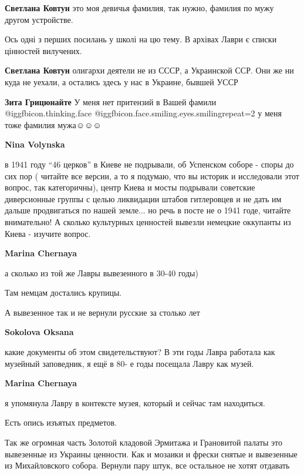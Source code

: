 \begin{itemize}
\begin{itemize}
\begin{itemize}
\textbf{Светлана Ковтун} это моя девичья фамилия, так нужно, фамилия по мужу другом устройстве.

Ось одні з перших посилань у школі на цю тему.
В архівах Лаври є списки цінностей вилучених.

\textbf{Светлана Ковтун} олигархи деятели не из СССР, а Украинской ССР. Они же ни куда не уехали, а остались здесь у нас в Украине, бывшей УССР

\textbf{Зита Грицюнайте}
У меня нет притензий в Вашей фамили  @igg{fbicon.thinking.face}  @igg{fbicon.face.smiling.eyes.smiling}{repeat=2} у меня тоже фамилия мужа☺☺☺

\end{itemize} %

\textbf{Nina Volynska} 

в 1941 году \enquote{46 церков} в Киеве не подрывали, об Успенском соборе - споры до сих
пор ( читайте все версии, а то я подумаю, что вы историк и исследовали этот
вопрос, так категоричны), центр Киева и мосты подрывали советские диверсионные
группы с целью ликвидации штабов гитлеровцев и не дать им дальше продвигаться
по нашей земле... но речь в посте не о 1941 годе, читайте внимательно! А сколько
культурных ценностей вывезли немецкие оккупанты из Киева - изучите вопрос.

\begin{itemize} %
\textbf{Marina Chernaya} 

а сколько из той же Лавры вывезенного в 30-40 годы)

Там немцам достались крупицы.

А вывезенное так и не вернули русские за столько лет

\textbf{Sokolova Oksana} 

какие документы об этом свидетельствуют? В эти годы Лавра работала как музейный
заповедник, я ещё в 80- е годы посещала Лавру как музей.

\textbf{Marina Chernaya} 

я упомянула Лавру в контексте музея, который и сейчас там находиться.

Есть опись изъятых предметов.

Так же огромная часть Золотой кладовой Эрмитажа и Грановитой палаты это вывезенные из Украины ценности.
Как и мозаики и фрески снятые и вывезенные из Михайловского собора.
Вернули пару штук, все остальное не хотят отдавать


\end{itemize}
\end{itemize}
\end{itemize}
